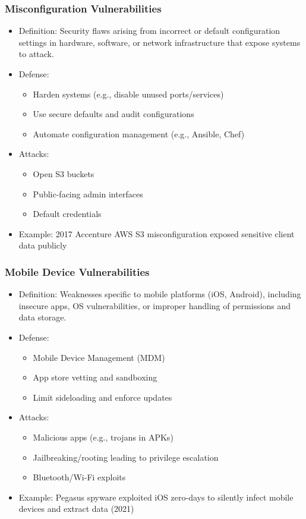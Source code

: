 \documentclass[11pt]{article}
\begin{document}
\subsubsection{Misconfiguration Vulnerabilities}
\label{sec:org94a8ea1}
\begin{itemize}
\item Definition: Security flaws arising from incorrect or default configuration settings in hardware, software, or network infrastructure that expose systems to attack.
\item Defense:
\begin{itemize}
\item Harden systems (e.g., disable unused ports/services)
\item Use secure defaults and audit configurations
\item Automate configuration management (e.g., Ansible, Chef)
\end{itemize}
\item Attacks:
\begin{itemize}
\item Open S3 buckets
\item Public-facing admin interfaces
\item Default credentials
\end{itemize}
\item Example: 2017 Accenture AWS S3 misconfiguration exposed sensitive client data publicly
\end{itemize}
\subsubsection{Mobile Device Vulnerabilities}
\label{sec:org7933dbd}
\begin{itemize}
\item Definition: Weaknesses specific to mobile platforms (iOS, Android), including insecure apps, OS vulnerabilities, or improper handling of permissions and data storage.
\item Defense:
\begin{itemize}
\item Mobile Device Management (MDM)
\item App store vetting and sandboxing
\item Limit sideloading and enforce updates
\end{itemize}
\item Attacks:
\begin{itemize}
\item Malicious apps (e.g., trojans in APKs)
\item Jailbreaking/rooting leading to privilege escalation
\item Bluetooth/Wi-Fi exploits
\end{itemize}
\item Example: Pegasus spyware exploited iOS zero-days to silently infect mobile devices and extract data (2021)
\end{itemize}
\end{document}
